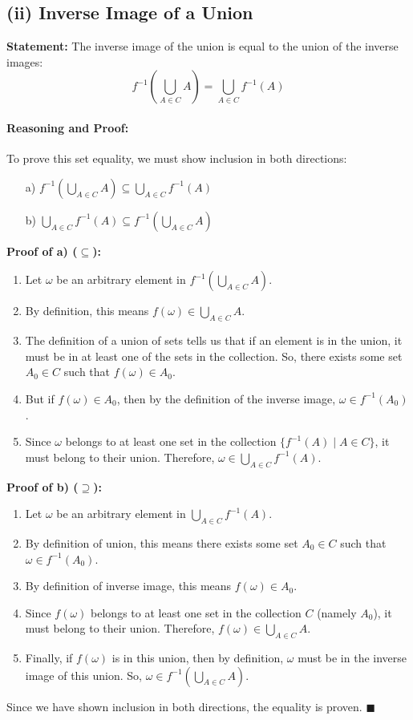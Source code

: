 \documentclass[11pt,a4paper]{article}
\begin{document}
\subsection*{(ii) Inverse Image of a Union}

\textbf{Statement:} The inverse image of the union is equal to the union of the inverse images:
\[ f^{-1}\left(\bigcup_{A \in C} A\right) = \bigcup_{A \in C} f^{-1}(A) \]

\paragraph{Reasoning and Proof:}
To prove this set equality, we must show inclusion in both directions:
\begin{enumerate}
    \item[a)] $f^{-1}\left(\bigcup_{A \in C} A\right) \subseteq \bigcup_{A \in C} f^{-1}(A)$
    \item[b)] $\bigcup_{A \in C} f^{-1}(A) \subseteq f^{-1}\left(\bigcup_{A \in C} A\right)$
\end{enumerate}

\textbf{Proof of a) ($\subseteq$):}
\begin{enumerate}
    \item Let $\omega$ be an arbitrary element in $f^{-1}\left(\bigcup_{A \in C} A\right)$.
    \item By definition, this means $f(\omega) \in \bigcup_{A \in C} A$.
    \item The definition of a union of sets tells us that if an element is in the union, it must be in at least one of the sets in the collection. So, there exists some set $A_0 \in C$ such that $f(\omega) \in A_0$.
    \item But if $f(\omega) \in A_0$, then by the definition of the inverse image, $\omega \in f^{-1}(A_0)$.
    \item Since $\omega$ belongs to at least one set in the collection $\{f^{-1}(A) \mid A \in C\}$, it must belong to their union. Therefore, $\omega \in \bigcup_{A \in C} f^{-1}(A)$.
\end{enumerate}

\textbf{Proof of b) ($\supseteq$):}
\begin{enumerate}
    \item Let $\omega$ be an arbitrary element in $\bigcup_{A \in C} f^{-1}(A)$.
    \item By definition of union, this means there exists some set $A_0 \in C$ such that $\omega \in f^{-1}(A_0)$.
    \item By definition of inverse image, this means $f(\omega) \in A_0$.
    \item Since $f(\omega)$ belongs to at least one set in the collection $C$ (namely $A_0$), it must belong to their union. Therefore, $f(\omega) \in \bigcup_{A \in C} A$.
    \item Finally, if $f(\omega)$ is in this union, then by definition, $\omega$ must be in the inverse image of this union. So, $\omega \in f^{-1}\left(\bigcup_{A \in C} A\right)$.
\end{enumerate}
Since we have shown inclusion in both directions, the equality is proven.
\hfill $\blacksquare$
\end{document}

